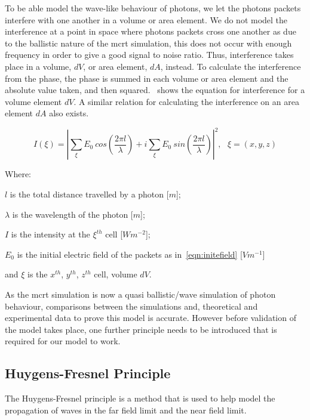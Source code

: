 To be able model the wave-like behaviour of photons, we let the photons packets interfere with one another in a volume or area element. 
We do not model the interference at a point in space where photons packets cross one another as due to the ballistic nature of the \gls*{mcrt} simulation, this does not occur with enough frequency in order to give a good signal to noise ratio. 
Thus, interference takes place in a volume, $dV$, or area element, $dA$, instead.
To calculate the interference from the phase, the phase is summed in each volume or area element and the absolute value taken, and then squared.~ shows the equation for interference for a volume element $dV$. A similar relation for calculating the interference on an area element $dA$ also exists.

\begin{equation}
I(\xi)= \left| \sum\limits_{\xi}E_0\ cos\left(\frac{2\pi l}{\lambda}\right) + i \sum\limits_{\xi}E_0\ sin\left(\frac{2\pi l}{\lambda}\right)\right|^2,\ \ \ \xi=(x,y,z)
\label{eqn:intense}
\end{equation}

\noindent Where:

\indent $l$ is the total distance travelled by a photon [$m$];

\indent $\lambda$ is the wavelength of the photon [$m$];

\indent $I$ is the intensity at the $\xi^{th}$ cell [$W m^{-2}$];

\indent $E_0$ is the initial electric field of the packets as in~\cref{eqn:initefield} [$Vm^{-1}$]

\indent and $\xi$ is the $x^{th}$, $y^{th}$, $z^{th}$ cell, volume $dV$.

\medskip

As the \gls*{mcrt} simulation is now a quasi ballistic/wave simulation of photon behaviour, comparisons between the simulations and, theoretical and experimental data to prove this model is accurate. However before validation of the model takes place, one further principle needs to be introduced that is required for our model to work.

\subsection{Huygens-Fresnel Principle}

The Huygens-Fresnel principle is a method that is used to help model the propagation of waves in the far field limit and the near field limit. 


